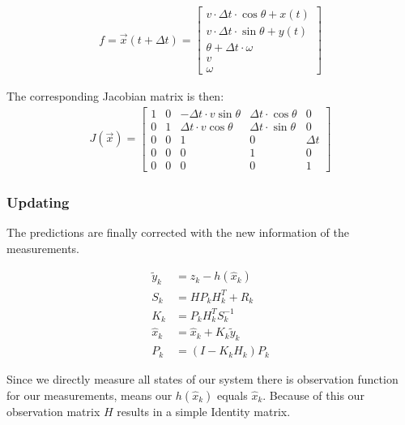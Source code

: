 \documentclass[11pt,oneside,openright]{mpreport}
\begin{document}
\begin{align*}
f = \vec{x}(t + \Delta t)=
\begin{bmatrix}
v \cdot \Delta t \cdot \cos{\theta}+ x(t) \\
v \cdot \Delta t \cdot \sin{\theta}+ y(t) \\
\theta + \Delta t \cdot \omega\\
v\\
\omega
\end{bmatrix} 
\end{align*}

The corresponding Jacobian matrix is then:
\begin{align*}
J(\vec{x})=
\begin{bmatrix}
1 & 0 & -\Delta t \cdot v \sin{\theta} & \Delta t \cdot \cos{\theta} & 0\\
0 & 1 & \Delta t \cdot v \cos{\theta} & \Delta t \cdot \sin{\theta}  & 0\\
0 & 0 & 1 & 0 & \Delta t\\
0 & 0 & 0 & 1 & 0\\
0 & 0 & 0 & 0 & 1
\end{bmatrix} 
\end{align*}



\subsubsection{Updating}

The predictions are finally corrected with the new information of the measurements.

\begin{align*}
\tilde{y}_k &= z_k -h(\hat{x}_{k})\\
S_k &= H P_k H^T_k + R_k\\
K_k &= P_k H^T_k S_k^{-1}\\
\hat{x}_k &= \hat{x}_k + K_k \tilde{y}_k\\
P_k &= (I - K_k H_k) P_k
\end{align*}


Since we directly measure all states of our system there is observation function for our measurements, means our
$h(\hat{x}_k)$ equals $\hat{x}_k$. Because of this our observation matrix $H$ results in a simple Identity matrix.
\end{document}
